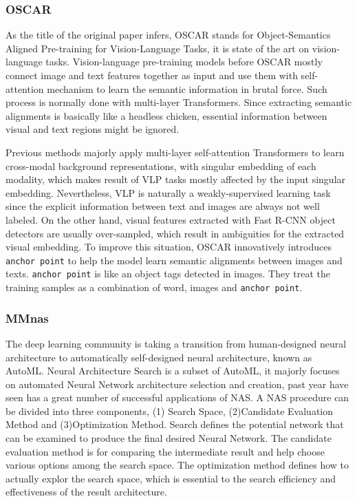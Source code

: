\documentclass[12pt, a4paper]{article}
\begin{document}
\subsubsection*{OSCAR}

\par\noindent As the title of the original paper infers, OSCAR \cite{DBLP:journals/corr/abs-2004-06165} stands for Object-Semantics Aligned Pre-training for Vision-Language Tasks, it is state of the art on vision-language tasks. Vision-language pre-training models before OSCAR \cite{DBLP:journals/corr/abs-2004-06165} mostly connect image and text features together as input and use them with self-attention mechanism to learn the semantic information in brutal force. Such process is normally done with multi-layer Transformers. Since extracting semantic alignments is basically like a headless chicken, essential information between visual and text regions might be ignored.

\par\noindent \newline Previous methods majorly apply multi-layer self-attention Transformers to learn cross-modal background representations, with singular embedding of each modality, which makes result of VLP tasks mostly affected by the input singular embedding. Nevertheless, VLP is naturally a weakly-supervised learning task since the explicit information between text and images are always not well labeled. On the other hand, visual features extracted with Fast R-CNN object detectors  are usually over-sampled, which result in ambiguities for the extracted visual embedding. To improve this situation, OSCAR \cite{DBLP:journals/corr/abs-2004-06165} innovatively introduces \verb|anchor point| to help the model learn semantic alignments between images and texts. \verb|anchor point| is like an object tags detected in images. They treat the training samples as a combination of word, images and \verb|anchor point|.

\subsubsection*{MMnas}
\par\noindent The deep learning community is taking a transition from human-designed neural architecture to automatically self-designed neural architecture, known as AutoML. Neural Architecture Search is a subset of AutoML, it majorly focuses on automated Neural Network architecture selection and creation, past year have seen has a great number of successful applications of NAS. A NAS procedure can be divided into three components, (1) Search Space, (2)Candidate Evaluation Method and (3)Optimization Method. Search defines the potential network that can be examined to produce the final desired Neural Network. The candidate evaluation method is for comparing the intermediate result and help choose various options among the search space. The optimization method defines how to actually explor the search space, which is essential to the search efficiency and effectiveness of the result architecture.
\end{document}
